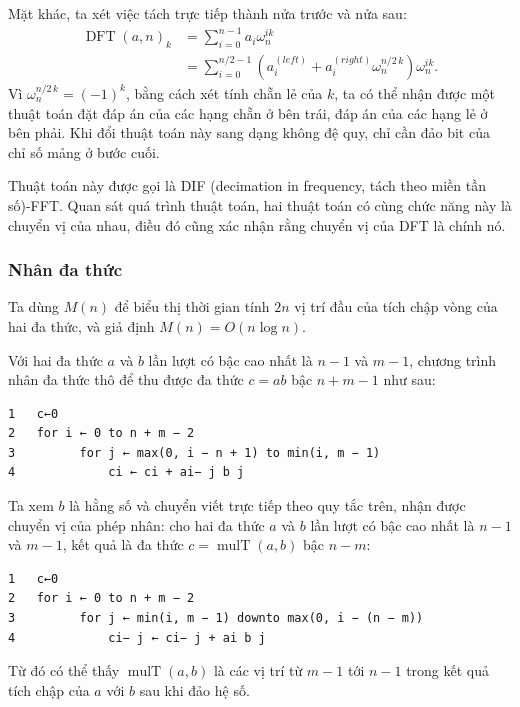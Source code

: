 \documentclass[11pt]{article}
\begin{document}
Mặt khác, ta xét việc tách trực tiếp thành nửa trước và nửa sau:
\[
\begin{aligned}
\operatorname{DFT}(a,n)_k
  &= \sum_{i=0}^{n-1} a_i\omega_n^{ik}\\
  &= \sum_{i=0}^{n/2-1}
     \left(a_i^{(\mathit{left})}
     +a_i^{(\mathit{right})}\omega_n^{n/2\,k}\right)\omega_n^{ik}.
\end{aligned}
\]
Vì \(\omega_n^{n/2\,k}=(-1)^k\), bằng cách xét tính chẵn lẻ của \(k\), ta có
thể nhận được một thuật toán đặt đáp án của các hạng chẵn ở bên trái, đáp án
của các hạng lẻ ở bên phải. Khi đổi thuật toán này sang dạng không đệ quy, chỉ
cần đảo bit của chỉ số mảng ở bước cuối.

Thuật toán này được gọi là DIF (decimation in frequency, tách theo miền tần
số)-FFT. Quan sát quá trình thuật toán, hai thuật toán có cùng chức năng này là
chuyển vị của nhau, điều đó cũng xác nhận rằng chuyển vị của DFT là chính nó.

\subsubsection{Nhân đa thức}

Ta dùng \(M(n)\) để biểu thị thời gian tính \(2n\) vị trí đầu của tích chập
vòng của hai đa thức, và giả định \(M(n)=O(n\log n)\).

Với hai đa thức \(a\) và \(b\) lần lượt có bậc cao nhất là \(n-1\) và \(m-1\),
chương trình nhân đa thức thô để thu được đa thức \(c=ab\) bậc \(n+m-1\) như
sau:

\begin{verbatim}
1   c←0
2   for i ← 0 to n + m − 2
3         for j ← max(0, i − n + 1) to min(i, m − 1)
4             ci ← ci + ai− j b j
\end{verbatim}

Ta xem \(b\) là hằng số và chuyển viết trực tiếp theo quy tắc trên, nhận được
chuyển vị của phép nhân: cho hai đa thức \(a\) và \(b\) lần lượt có bậc cao
nhất là \(n-1\) và \(m-1\), kết quả là đa thức
\(c=\operatorname{mulT}(a,b)\) bậc \(n-m\):

\begin{verbatim}
1   c←0
2   for i ← 0 to n + m − 2
3         for j ← min(i, m − 1) downto max(0, i − (n − m))
4             ci− j ← ci− j + ai b j
\end{verbatim}

Từ đó có thể thấy \(\operatorname{mulT}(a,b)\) là các vị trí từ \(m-1\) tới
\(n-1\) trong kết quả tích chập của \(a\) với \(b\) sau khi đảo hệ số.
\end{document}
